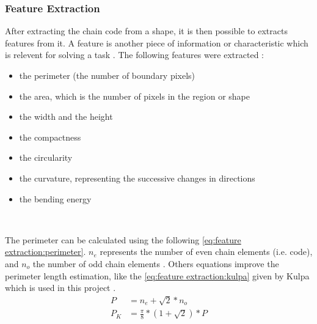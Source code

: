 
\subsubsection{Feature Extraction}


After extracting the chain code from a shape, it is then possible to extracts features from it. A feature is another piece of information or characteristic which is relevent for solving a task \cite{bib:extraction:definition}. The following features were extracted : 
\begin{itemize}
	\item the perimeter (the number of boundary pixels)
	\item the area, which is the number of pixels in the region or shape 
	\item the width and the height 
	\item the compactness 
	\item the circularity 
	\item the curvature, representing the successive changes in directions 
	\item the bending energy 
\end{itemize}

~~ 

The perimeter can be calculated using the following \vref{eq:feature extraction:perimeter}. $n_e$ represents the number of even chain elements (i.e. code), and $n_o$ the number of odd chain elements \cite{bib:chain:EstimateAreasAndPerimetersChainCode}. Others equations improve the perimeter length estimation, like the \vref{eq:feature extraction:kulpa} given by Kulpa which is used in this project \cite{bib:chain:ObjectDescription}.
\begin{align} 
P &= n_e + \sqrt{2}*n_o \label{eq:feature extraction:perimeter} \\
P_K &= \frac{\pi}{8} * (1 + \sqrt{2}) * P \label{eq:feature extraction:kulpa}
\end{align}


~~

